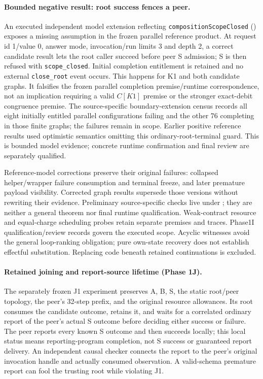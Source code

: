 \documentclass[11pt,a4paper]{article}
\theoremstyle{definition}
\theoremstyle{remark}
\begin{document}
\paragraph{Bounded negative result: root success fences a peer.} An executed independent model extension reflecting \texttt{compositionScopeClosed} () exposes a missing assumption in the frozen parallel reference product. At request id 1/value 0, answer mode, invocation/run limits 3 and depth 2, a correct candidate result lets the root caller succeed before peer S admission; S is then refused with \texttt{scope\_closed}. Initial completion entitlement is retained and no external \texttt{close\_root} event occurs. This happens for K1 and both candidate graphs. It falsifies the frozen parallel completion premise/runtime correspondence, not an implication requiring a valid $C[K1]$ premise or the stronger exact-debit congruence premise. The source-specific boundary-extension census records all eight initially entitled parallel configurations failing and the other 76 completing in those finite graphs; the failures remain in scope. Earlier positive reference results used optimistic semantics omitting this ordinary-root-terminal guard. This is bounded model evidence; concrete runtime confirmation and final review are separately qualified.

Reference-model corrections preserve their original failures: collapsed helper/wrapper failure consumption and terminal freeze, and later premature payload visibility. Corrected graph results supersede those versions without rewriting their evidence. Preliminary source-specific checks live under ; they are neither a general theorem nor final runtime qualification. Weak-contract resource and equal-charge scheduling probes retain separate premises and traces. Phase1I qualification/review records govern the executed scope. Acyclic witnesses avoid the general loop-ranking obligation; pure own-state recovery does not establish effectful substitution. Replacing code beneath retained continuations is excluded.

\paragraph{Retained joining and report-source lifetime (Phase 1J).} The separately frozen J1 experiment preserves A, B, S, the static root/peer topology, the peer's 32-step prefix, and the original resource allowances. Its root consumes the candidate outcome, retains it, and waits for a correlated ordinary report of the peer's actual S outcome before deciding either success or failure. The peer reports every known S outcome and then succeeds locally; this local status means reporting-program completion, not S success or guaranteed report delivery. An independent causal checker connects the report to the peer's original invocation handle and actually consumed observation. A valid-schema premature report can fool the trusting root while violating J1.
\end{document}
